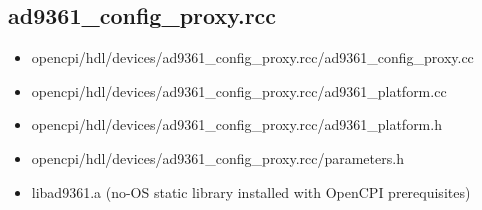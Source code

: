 \documentclass{article}
\def\comp{ad9361\_config\_proxy}
\begin{document}
\subsection*{\comp.rcc}
\begin{itemize}
	\item opencpi/hdl/devices/\comp{}.rcc/\comp{}.cc
	\item opencpi/hdl/devices/\comp{}.rcc/ad9361\_platform.cc
	\item opencpi/hdl/devices/\comp{}.rcc/ad9361\_platform.h
	\item opencpi/hdl/devices/\comp{}.rcc/parameters.h
	\item libad9361.a (no-OS static library installed with OpenCPI prerequisites)
\end{itemize}
\begin{landscape}


\end{landscape}
\end{document}
